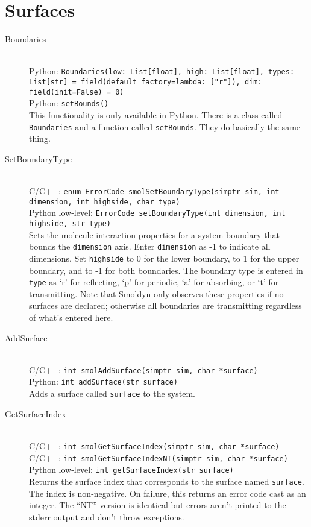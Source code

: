 \documentclass {book}
\newcommand {\ttt} {\texttt}
\begin{document}
\section{Surfaces}

\begin{description}

\item[Boundaries]
\hfill \\
Python: \ttt{Boundaries(low: List[float], high: List[float], types: List[str] = field(default\_factory=lambda: ["r"]), dim: field(init=False) = 0)}\\
Python: \ttt{setBounds()}\\
This functionality is only available in Python. There is a class called \ttt{Boundaries} and a function called \ttt{setBounds}. They do basically the same thing.

\item[SetBoundaryType]
\hfill \\
C/C++: \ttt{enum ErrorCode smolSetBoundaryType(simptr sim, int dimension, int highside, char type)}\\
Python low-level: \ttt{ErrorCode setBoundaryType(int dimension, int highside, str type)}\\
Sets the molecule interaction properties for a system boundary that bounds the \ttt{dimension} axis. Enter \ttt{dimension} as -1 to indicate all dimensions. Set \ttt{highside} to 0 for the lower boundary, to 1 for the upper boundary, and to -1 for both boundaries. The boundary type is entered in \ttt{type} as `r' for reflecting, `p' for periodic, `a' for absorbing, or `t' for transmitting. Note that Smoldyn only observes these properties if no surfaces are declared; otherwise all boundaries are transmitting regardless of what's entered here.

\item[AddSurface]
\hfill \\
C/C++: \ttt{int smolAddSurface(simptr sim, char *surface)}\\
Python: \ttt{int addSurface(str surface)}\\
Adds a surface called \ttt{surface} to the system.

\item[GetSurfaceIndex]
\hfill \\
C/C++: \ttt{int smolGetSurfaceIndex(simptr sim, char *surface)}\\
C/C++: \ttt{int smolGetSurfaceIndexNT(simptr sim, char *surface)}\\
Python low-level: \ttt{int getSurfaceIndex(str surface)}\\
Returns the surface index that corresponds to the surface named \ttt{surface}. The index is non-negative. On failure, this returns an error code cast as an integer. The ``NT'' version is identical but errors aren't printed to the stderr output and don't throw exceptions.


\end{description}
\end{document}
